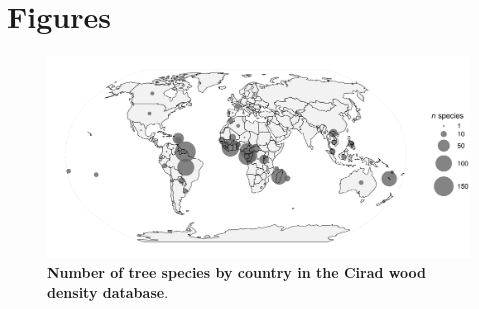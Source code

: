 \documentclass[a4paper, 12pt, leqno, dvipsnames]{article}\usepackage[]{graphicx}\usepackage[]{color}
\begin{document}
\newpage

\section{Figures}

\vfill
\begin{figure}[!ht] 
    \begin{center} 
      \includegraphics[width=\textwidth]{figs/Location.pdf}

      \caption{\textbf{Number of tree species by country in the Cirad wood density
          database}.}

      \label{fig:Location}
    \end{center}
\end{figure}
\vfill

\newpage
\end{document}
